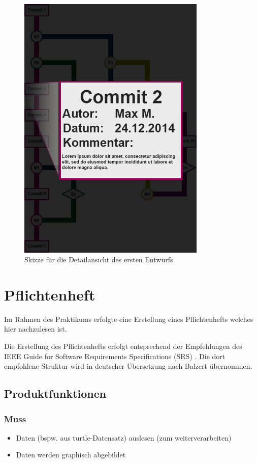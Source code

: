\documentclass[color, ddc]{tudscrreprt}
\begin{document}
\begin{figure}[ht!]
\centering
\includegraphics[width=0.8\textwidth]{Skizzen/2015-01 VisualisierungsSkizze-rev_detail.png}
\caption{Skizze für die Detailansicht des ersten Entwurfs}
\label{entwurf_detail-img}
\end{figure}

\chapter{Pflichtenheft}

Im Rahmen des Praktikums erfolgte eine Erstellung eines Pflichtenhefts welches hier nachzulesen ist.

Die Erstellung des Pflichtenhefts erfolgt entsprechend der Empfehlungen des IEEE Guide for Software Requirements Specifications (SRS) \cite{ieee1998ieee}. Die dort empfohlene Struktur wird in deutscher Übersetzung nach Balzert \cite{balzert2009lehrbuch} übernommen.

\section{Produktfunktionen}
\subsection{Muss}
\begin{itemize}
\item Daten (bspw. aus turtle-Datensatz) auslesen (zum weiterverarbeiten)
\item Daten werden graphisch abgebildet
\end{itemize}
\end{document}
